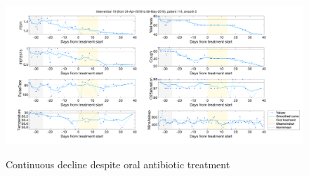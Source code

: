 \begin{appendices}
    \begin{figure}[!h]
    \caption{Continuous decline despite oral antibiotic treatment}
    \centering
    \includegraphics[width=150mm]{images/Intervention19_ID114.png}
    \label{fig:intrdecline}
    \end{figure}
    



    
\end{appendices}